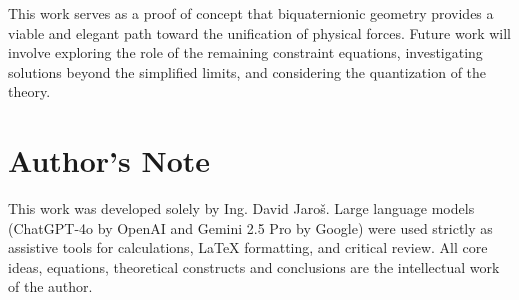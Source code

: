 \documentclass[11pt, a4paper]{article}
\begin{document}
This work serves as a proof of concept that biquaternionic geometry provides a viable and elegant path toward the unification of physical forces. Future work will involve exploring the role of the remaining constraint equations, investigating solutions beyond the simplified limits, and considering the quantization of the theory.


\section*{Author's Note}

This work was developed solely by Ing. David Jaroš.  
Large language models (ChatGPT-4o by OpenAI and Gemini 2.5 Pro by Google) were used strictly as assistive tools for calculations, LaTeX formatting, and critical review.  
All core ideas, equations, theoretical constructs and conclusions are the intellectual work of the author.
\end{document}

